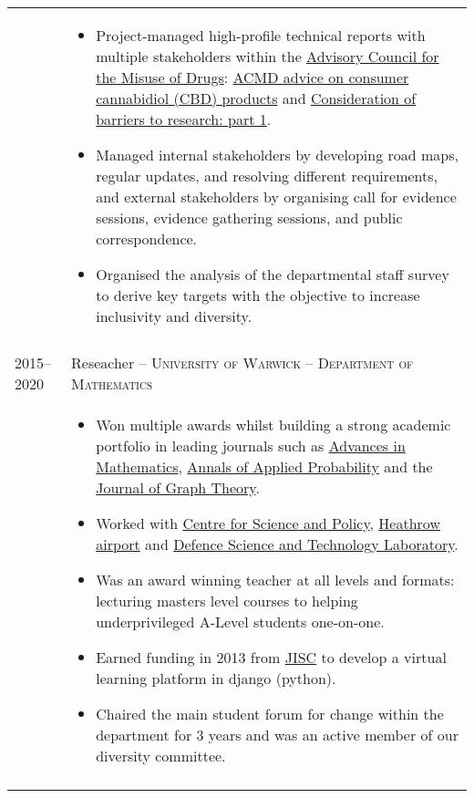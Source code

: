 \documentclass[a4paper,10pt]{article}
\begin{document}
\begin{tabular}{p{2.25cm}|p{15cm}}
 	 & \vspace{-0.07 in}\begin{itemize}
 	 	\item Project-managed high-profile technical reports with multiple stakeholders within the \href{https://www.gov.uk/government/organisations/advisory-council-on-the-misuse-of-drugs}{Advisory Council for the Misuse of Drugs}: \href{https://www.gov.uk/government/publications/acmd-advice-on-consumer-cannabidiol-cbd-products}{ACMD advice on consumer cannabidiol (CBD) products} and \href{https://www.gov.uk/government/publications/consideration-of-barriers-to-research-part-1}{Consideration of barriers to research: part 1}.
 	 	\item Managed internal stakeholders by developing road maps, regular updates, and resolving different requirements, and external stakeholders by organising call for evidence sessions, evidence gathering sessions, and public correspondence.
 	 	\item Organised the analysis of the departmental staff survey to derive key targets with the objective to increase inclusivity and diversity.
	\end{itemize}\vspace{-0.15 in}\\
\multicolumn{2}{c}{} \\
%
%
	\textsc{2015--2020} & \large{Reseacher -- \textsc{University of Warwick} -- \textsc{Department of Mathematics}}\\
	 & \vspace{-0.07 in}\begin{itemize}
	\item Won multiple awards whilst building a strong academic portfolio in leading journals such as \href{https://www.sciencedirect.com/science/article/pii/S0001870818303347}{Advances in Mathematics}, \href{https://projecteuclid.org/journals/annals-of-applied-probability/volume-32/issue-1/From-the-Bernoulli-factory-to-a-dice-enterprise-via-perfect/10.1214/21-AAP1679.short}{Annals of Applied Probability} and the \href{http://onlinelibrary.wiley.com/doi/10.1002/jgt.22002/abstract}{Journal of Graph Theory}.
	\item Worked with \href{https://www.csap.cam.ac.uk/}{Centre for Science and Policy}, \href{https://www.heathrow.com/}{Heathrow airport} and \href{https://www.gov.uk/government/organisations/defence-science-and-technology-laboratory}{Defence Science and Technology Laboratory}.
	\item Was an award winning teacher at all levels and formats: lecturing masters level courses to helping underprivileged A-Level students one-on-one.
	\item Earned funding in 2013 from \href{https://www.jisc.ac.uk/}{JISC} to develop a virtual learning platform in django (python).
	\item Chaired the main student forum for change within the department for 3 years and was an active member of our diversity committee.
\end{itemize}\vspace{-0.15 in}\\
\multicolumn{2}{c}{} \\
\end{tabular}
\end{document}
